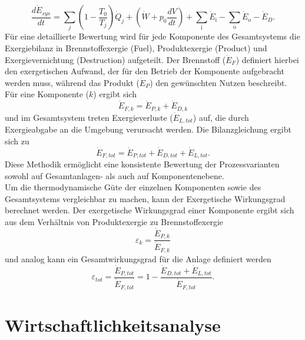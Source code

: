 \begin{equation}
\frac{d\dot{E}_{sys}}{dt} = \sum_j \left( 1 - \frac{T_0}{T_j} \right) \dot{Q}_j
+ \left( \dot{W} + p_0 \frac{dV}{dt} \right)
+ \sum_{\text{i}} \dot{E}_{\text{i}}
- \sum_{\text{o}} \dot{E}_{\text{o}}
- \dot{E}_D.
\end{equation}
Für eine detaillierte Bewertung wird für jede Komponente des Gesamtsystems die Exergiebilanz in Brennstoffexergie (Fuel), Produktexergie (Product) und Exergievernichtung (Destruction) aufgeteilt. Der Brennstoff ($\dot{E}_F$) definiert hierbei den exergetischen Aufwand, der für den Betrieb der Komponente aufgebracht werden muss, während das Produkt ($\dot{E}_P$) den gewünschten Nutzen beschreibt. Für eine Komponente ($k$) ergibt sich
\begin{equation}
\dot{E}_{F,k} = \dot{E}_{P,k} + \dot{E}_{D,k}
\end{equation}
und im Gesamtsystem treten Exergieverluste ($\dot{E}_{L,tot}$) auf, die durch Exergieabgabe an die Umgebung verursacht werden. Die Bilanzgleichung ergibt sich zu
\begin{equation}
\dot{E}_{F,tot} = \dot{E}_{P,tot} + \dot{E}_{D,tot} + \dot{E}_{L,tot}.
\end{equation}
Diese Methodik ermöglicht eine konsistente Bewertung der Prozessvarianten sowohl auf Gesamtanlagen- als auch auf Komponentenebene.\\
Um die thermodynamische Güte der einzelnen Komponenten sowie des Gesamtsystems vergleichbar zu machen, kann der Exergetische Wirkungsgrad berechnet werden. Der exergetische Wirkungsgrad einer Komponente ergibt sich aus dem Verhältnis von Produktexergie zu Brennstoffexergie
\begin{equation}
\varepsilon_k = \frac{\dot{E}_{P,k}}{\dot{E}_{F,k}}
\end{equation}
und analog kann ein Gesamtwirkungsgrad für die Anlage definiert werden
\begin{equation}
\varepsilon_{tot} 
= \frac{\dot{E}_{P,tot}}{\dot{E}_{F,tot}}
= 1 - \frac{\dot{E}_{D,tot} + \dot{E}_{L,tot}}{\dot{E}_{F,tot}}.
\end{equation}

\section{Wirtschaftlichkeitsanalyse}
\label{sec:wirtschaftlichkeitsanalyse}

